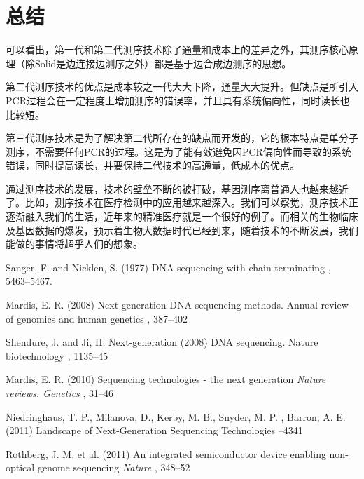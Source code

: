 \documentclass[12pt]{article} %
\begin{document}



\section{总结} %
可以看出，第一代和第二代测序技术除了通量和成本上的差异之外，其测序核心原理（除Solid是边连接边测序之外）都是基于边合成边测序的思想。

第二代测序技术的优点是成本较之一代大大下降，通量大大提升。但缺点是所引入PCR过程会在一定程度上增加测序的错误率，并且具有系统偏向性，同时读长也比较短。

第三代测序技术是为了解决第二代所存在的缺点而开发的，它的根本特点是单分子测序，不需要任何PCR的过程。这是为了能有效避免因PCR偏向性而导致的系统错误，同时提高读长，并要保持二代技术的高通量，低成本的优点。

通过测序技术的发展，技术的壁垒不断的被打破，基因测序离普通人也越来越近了。比如，测序技术在医疗检测中的应用越来越深入。我们可以察觉，测序技术正逐渐融入我们的生活，近年来的精准医疗就是一个很好的例子。而相关的生物临床及基因数据的爆发，预示着生物大数据时代已经到来，随着技术的不断发展，我们能做的事情将超乎人们的想象。



\begin{thebibliography}{99} 
 Sanger, F. and Nicklen, S.  (1977)
 \newblock DNA sequencing with chain-terminating 
 , 5463–5467.
 
 Mardis, E. R.  (2008)
 \newblock Next-generation DNA sequencing methods. Annual review of genomics and human genetics
 , 387–402 
 
Shendure, J. and Ji, H. Next-generation  (2008)
 \newblock DNA sequencing. Nature biotechnology
 , 1135–45
 
Mardis, E. R.  (2010)
\newblock Sequencing technologies - the next generation
\newblock \emph{Nature reviews. Genetics}
, 31–46

Niedringhaus, T. P., Milanova, D., Kerby, M. B., Snyder, M. P. , Barron, A. E.  (2011)
 \newblock Landscape of Next-Generation Sequencing Technologies
 –4341
 
Rothberg, J. M. et al.  (2011)
 \newblock An integrated semiconductor device enabling non-optical genome sequencing
  \newblock \emph{Nature}
 , 348–52
 
\end{thebibliography}
\end{document}
